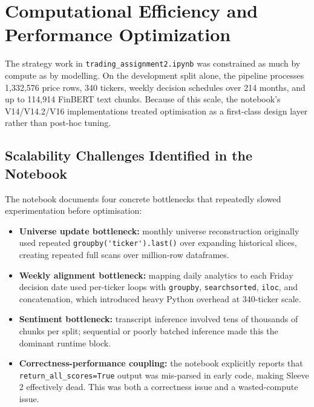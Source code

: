 \documentclass[11pt,twoside,a4paper]{article}
\begin{document}
\section{Computational Efficiency and Performance Optimization}
The strategy work in \verb|trading_assignment2.ipynb| was constrained as much by compute as by modelling. On the development split alone, the pipeline processes 1,332,576 price rows, 340 tickers, weekly decision schedules over 214 months, and up to 114,914 FinBERT text chunks. Because of this scale, the notebook's V14/V14.2/V16 implementations treated optimisation as a first-class design layer rather than post-hoc tuning.

\subsection*{Scalability Challenges Identified in the Notebook}
The notebook documents four concrete bottlenecks that repeatedly slowed experimentation before optimisation:
\begin{itemize}
    \item \textbf{Universe update bottleneck:} monthly universe reconstruction originally used repeated \verb|groupby('ticker').last()| over expanding historical slices, creating repeated full scans over million-row dataframes.
    \item \textbf{Weekly alignment bottleneck:} mapping daily analytics to each Friday decision date used per-ticker loops with \verb|groupby|, \verb|searchsorted|, \verb|iloc|, and concatenation, which introduced heavy Python overhead at 340-ticker scale.
    \item \textbf{Sentiment bottleneck:} transcript inference involved tens of thousands of chunks per split; sequential or poorly batched inference made this the dominant runtime block.
    \item \textbf{Correctness-performance coupling:} the notebook explicitly reports that \verb|return_all_scores=True| output was mis-parsed in early code, making Sleeve 2 effectively dead. This was both a correctness issue and a wasted-compute issue.
\end{itemize}
\end{document}
